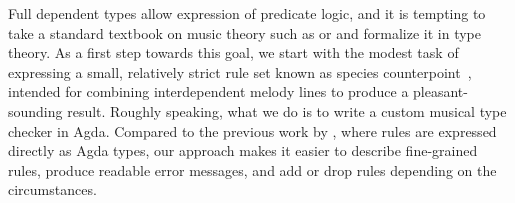 

Full dependent types allow expression of predicate logic, and it is
tempting to take a standard textbook on music theory such as
\citet{piston-harmony} or \citet{aldwell2018harmony} and formalize it
in type theory.  As a first step towards this goal, we start with the modest task of
expressing a small, relatively strict rule set known as species
counterpoint~\cite{fux-cp}, intended for combining interdependent
melody lines to produce a pleasant-sounding result.  Roughly speaking,
what we do is to write a custom musical type checker in Agda.
Compared to the previous work by \citet{cong-cp}, where rules are
expressed directly as Agda types, our approach makes it easier to
describe fine-grained rules, produce readable error messages, and add
or drop rules depending on the circumstances.



